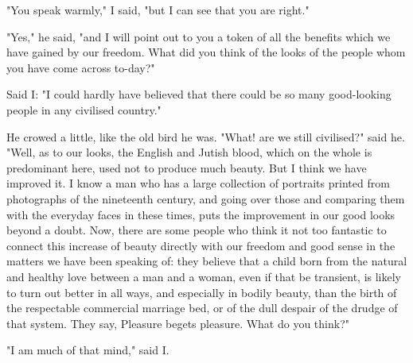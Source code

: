 "You speak warmly," I said, "but I can see that you are right."

"Yes," he said, "and I will point out to you a token of all the benefits
which we have gained by our freedom. What did you think of the looks of
the people whom you have come across to-day?"

Said I: "I could hardly have believed that there could be so many
good-looking people in any civilised country."

He crowed a little, like the old bird he was. "What! are we still
civilised?" said he. "Well, as to our looks, the English and Jutish
blood, which on the whole is predominant here, used not to produce much
beauty. But I think we have improved it. I know a man who has a large
collection of portraits printed from photographs of the nineteenth
century, and going over those and comparing them with the everyday faces
in these times, puts the improvement in our good looks beyond a doubt.
Now, there are some people who think it not too fantastic to connect
this increase of beauty directly with our freedom and good sense in the
matters we have been speaking of: they believe that a child born from
the natural and healthy love between a man and a woman, even if that be
transient, is likely to turn out better in all ways, and especially in
bodily beauty, than the birth of the respectable commercial marriage
bed, or of the dull despair of the drudge of that system. They say,
Pleasure begets pleasure. What do you think?"

"I am much of that mind," said I.
